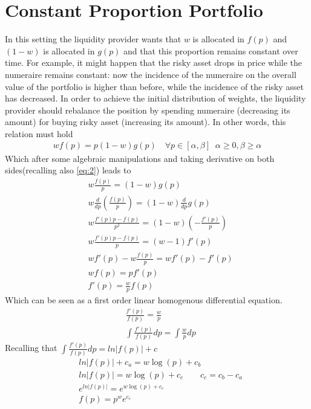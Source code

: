 \documentclass[12pt]{article}
\begin{document}
\section{Constant Proportion Portfolio}
In this setting the liquidity provider wants that $w$ is allocated in $f(p)$ and $(1-w)$ is allocated in $g(p)$ and that this proportion remains constant over time. For example, it might happen that the risky asset drops in price while the numeraire remains constant: now the incidence of the numeraire on the overall value of the portfolio is higher than before, while the incidence of the risky asset has decreased. In order to achieve the initial distribution of weights, the liquidity provider should rebalance the position by spending numeraire (decreasing its amount) for buying risky asset (increasing its amount). In other words, this relation must hold
\begin{align*}
    w f(p) = p(1-w) g(p) \quad \forall p\in[\alpha,\beta] \; \;\alpha\geq 0, \beta\geq \alpha
\end{align*}
Which after some algebraic manipulations and taking derivative on both sides(recalling also \eqref{eq:2}) leads to
\begin{align*}
     & w\frac{f(p)}{p} =(1-w)g(p)                                       \\
     & w\frac{d}{dp}\left(\frac{f(p)}{p}\right) = (1-w)\frac{d}{dp}g(p) \\
     & w\frac{f'(p)p-f(p)}{p^2} = (1-w)\left(-\frac{f'(p)}{p}\right)    \\
     & w\frac{f'(p)p-f(p)}{p} = (w-1)f'(p)                              \\
     & wf'(p) -w\frac{f(p)}{p} = wf'(p) -f'(p)                          \\
     & wf(p) = pf'(p)                                                   \\
     & f'(p) = \frac{w}{p}f(p)
\end{align*}
Which can be seen as a first order linear homogenous differential equation.
\begin{align*}
     & \frac{f'(p)}{f(p)} = \frac{w}{p}                 \\
     & \int \frac{f'(p)}{f(p)} dp = \int \frac{w}{p} dp
\end{align*}
Recalling that $\int\frac{f'(p)}{f(p)}dp=ln|f(p)| +c$
\begin{align*}
     & ln|f(p)| +c_a = w\log(p) +c_b                    \\
     & ln|f(p)| = w\log(p) +c_c      \qquad c_c=c_b-c_a \\
     & e^{ln|f(p)|} = e^{w\log(p) +c_c}                 \\
     & f(p) = p^w e^{c_c}
\end{align*}
\end{document}
